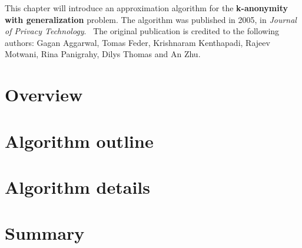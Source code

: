 This chapter will introduce an approximation algorithm for the \textbf{k-anonymity with generalization} problem.
The algorithm was published in 2005, in \textit{Journal of Privacy Technology}.~\cite{aggarwal} The original publication is credited to the following authors: Gagan Aggarwal, Tomas Feder, Krishnaram Kenthapadi, Rajeev Motwani, Rina Panigrahy, Dilys Thomas and An Zhu.

\section{Overview}\label{sec:overview}


\section{Algorithm outline}\label{sec:algorithm_outline}


\section{Algorithm details}


\section{Summary}
